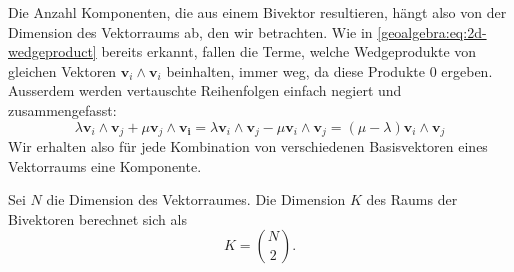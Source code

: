 Die Anzahl Komponenten, die aus einem Bivektor resultieren, hängt also von der Dimension des Vektorraums ab, den wir betrachten.
Wie in \eqref{geoalgebra:eq:2d-wedgeproduct} bereits erkannt, fallen die Terme, welche Wedgeprodukte von gleichen Vektoren $\mathbf{v}_i \wedge \mathbf{v}_i$ beinhalten,
immer weg, da diese Produkte $0$ ergeben. Ausserdem werden vertauschte Reihenfolgen einfach negiert und zusammengefasst: 
\begin{equation}
  \lambda \mathbf{v}_i \wedge \mathbf{v}_j + \mu \mathbf{v}_j \wedge \mathbf{v_i} = \lambda \mathbf{v}_i \wedge \mathbf{v}_j - \mu \mathbf{v}_i \wedge \mathbf{v}_j = (\mu - \lambda) \mathbf{v}_i \wedge \mathbf{v}_j
\end{equation}
Wir erhalten also für jede Kombination von verschiedenen Basisvektoren eines Vektorraums eine Komponente.
\begin{satz}
Sei $N$ die Dimension des Vektorraumes. Die Dimension $K$ des Raums der Bivektoren berechnet sich als
  \begin{equation}
    \label{geoalgebra:eq:components-bivectors}
    K = \binom{N}{2}.
  \end{equation}
\end{satz}


